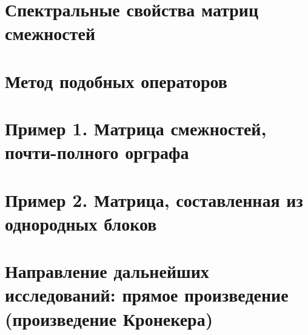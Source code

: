 \section*{Спектральные свойства матриц смежностей}

\section*{Метод подобных операторов}

\section*{Пример 1. Матрица смежностей, почти-полного орграфа}

\section*{Пример 2. Матрица, составленная из однородных блоков}

\section*{Направление дальнейших исследований: прямое произведение (произведение Кронекера)}

